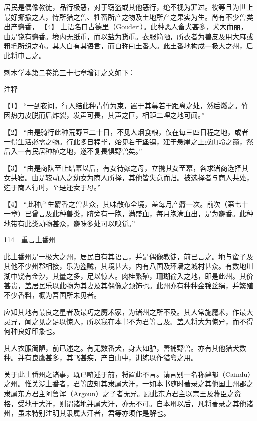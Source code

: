 \documentclass[12pt,UTF8]{ctexbook}
\begin{document}
居民是偶像教徒，品行极恶，对于窃盗或其他恶行，绝不视为罪过。彼等且为世上最好揶揄之人，恃所猎之兽、牲畜所产之物及土地所产之果实为生。尚有不少兽类出产麝香， 【4】 土语名曰古德里（Gouderi）。此种恶人畜犬甚多，犬大而丽，由是饶有麝香。境内无纸币，而以盐为货币。衣服简陋，所衣者为兽皮及用大麻或粗毛所织之布。其人自有其语言，而自称曰土番人。此土番地构成一极大之州，后此将申言之。

剌木学本第二卷第三十七章增订之文如下：

注释

【1】 “一到夜间，行人结此种青竹为束，置于其幕若干距离之处，然后燃之。竹因热力皮脱而后炸裂，发声可畏，其声之巨，相距二哩之地可闻。”

【2】 “由是骑行此种荒野亘二十日，不见人烟食粮，仅在每三四日程之地，或者一得生活必需之物。行此多日程毕，始见若干堡镇，建于悬崖之上或山岭之巅，然后入一有民居种植之地，遂不复畏惧野兽矣。”

【3】 “由是商队至止结幕以后，有女待嫁之母，立携其女至幕，各求诸商选择其女共寝。由是较动人之幼女为商人所择，其他皆失意而归。被选择者与商人共处，迄于商人行时，至是还女于母。”

【4】 “此种产生麝香之兽甚众，其味散布全境，盖每月产麝一次。前次（第七十一章）已曾言及此种兽类，脐旁有一胞，满盛血，每月胞满血出，是为麝香。此种地带有此类动物甚众，麝味多处可以嗅觉。”





114　重言土番州

此土番州是一极大之州，居民自有其语言，并是偶像教徒，前已言之。地与蛮子及其他不少州郡相接，乐为盗贼，其境甚大，内有八国及环墙之城村甚众。有数地川湖中饶有金沙，其量之多，足以惊人。肉桂繁殖，珊瑚输入之地，即是此州。其价甚贵，盖居民乐以此物为其妻及其偶像之颈饰也。此州亦有种种金锦丝绢，并繁殖不少香料，概为吾国所未见者。

应知其地有最良之星者及最巧之魔术家，为诸州之所不及。其人常施魔术，作最大灵异，闻之见之足以惊人，所以我在本书不为君等言及。盖人将大为惊异，而不得何种良好印象也。

其人衣服简陋，前已述之。有无数番犬，身大如驴，善捕野兽。亦有其他猎犬数种。并有良鹰甚多，其飞甚疾，产自山中，训练以作猎禽之用。

关于此土番州之诸事，既已略述于前，将置此不言。请言别一名称建都（Caindu）之州。惟关涉土番者，君等应知其隶属大汗，一如本书随时著录之其他国土州郡之隶属东方君主阿鲁浑（Argoun）之子者无异。顾此东方君主以宗王及藩臣之资格，受地于大汗，则谓诸地并属大汗，亦无不可。自本州以后，凡将著录之其他诸州，虽未特别注明其隶属大汗者，君等亦须作是解也。
\end{document}
